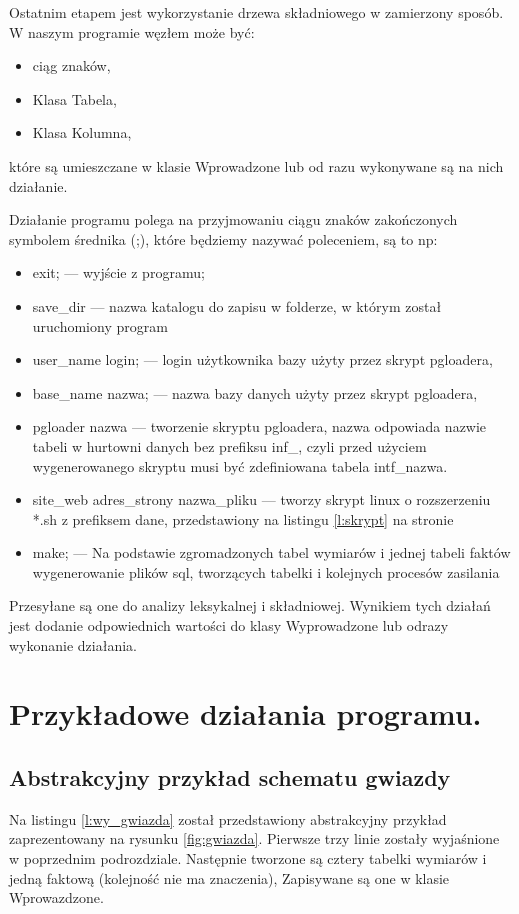 Ostatnim etapem jest wykorzystanie drzewa składniowego w zamierzony sposób.
W naszym programie węzłem może być:

 \begin{itemize}
  \item ciąg znaków,
  \item Klasa Tabela,
  \item Klasa Kolumna,
 \end{itemize}
które są umieszczane w klasie Wprowadzone lub od razu wykonywane są na nich działanie.

Działanie programu polega na przyjmowaniu ciągu znaków zakończonych symbolem średnika (;),
 które będziemy nazywać poleceniem, są to np:
\begin{itemize}
 \item exit; --- 
    wyjście z programu;
 \item save\_dir --- 
    nazwa katalogu do zapisu w folderze,
    w którym został uruchomiony program
 \item user\_name  login;  ---
    login użytkownika bazy użyty przez skrypt pgloadera,
 \item base\_name nazwa; ---
    nazwa bazy danych użyty przez skrypt pgloadera,
 \item pgloader nazwa --- 
    tworzenie skryptu pgloadera, nazwa odpowiada nazwie tabeli w hurtowni danych bez prefiksu inf\_, czyli przed użyciem 
    wygenerowanego skryptu musi być zdefiniowana tabela intf\_nazwa.
 \item site\_web adres\_strony  nazwa\_pliku ---
    tworzy skrypt linux o rozszerzeniu *.sh z prefiksem dane, 
    przedstawiony na listingu \ref{l:skrypt} na stronie \pageref{l:skrypt}
 \item make; ---
   Na podstawie zgromadzonych tabel wymiarów 
   i jednej tabeli faktów wygenerowanie plików sql, tworzących tabelki i kolejnych procesów zasilania 
\end{itemize}
Przesyłane są one do analizy leksykalnej i składniowej.
Wynikiem tych działań jest dodanie odpowiednich wartości do klasy Wyprowadzone 
lub odrazy wykonanie działania. 

 
\section{Przykładowe działania programu.}  \label{p_r_przyklady}

\subsection{Abstrakcyjny przykład schematu gwiazdy}
Na listingu \ref{l:wy_gwiazda} został przedstawiony abstrakcyjny przykład zaprezentowany na rysunku \ref{fig:gwiazda}.
Pierwsze trzy linie zostały wyjaśnione w poprzednim podrozdziale. 
Następnie tworzone są cztery tabelki wymiarów i jedną faktową
 (kolejność nie ma znaczenia),
Zapisywane są one w klasie Wprowazdzone.

